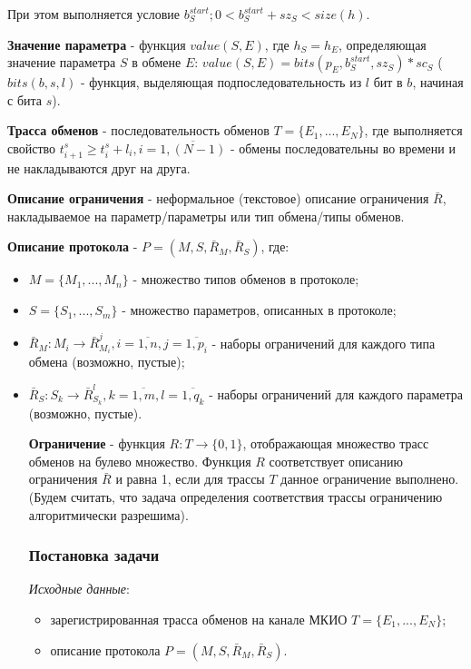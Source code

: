 При этом выполняется условие $b^{start}_S; 0 < b^{start}_S + sz_S < size(h)$.

\textbf{Значение параметра} - функция $value(S, E)$, где $h_S = h_E$, 
определяющая значение параметра $S$ в обмене $E$: $value(S, E) = bits(p_E, 
b^{start}_S, sz_S) * sc_S$ ($bits(b, s, l)$ - функция, выделяющая 
подпоследовательность из $l$ бит в $b$, начиная с бита $s$).

\textbf{Трасса обменов} - последовательность обменов $T = \{E_1, ..., E_N\}$, 
где выполняется свойство $t^s_{i+1} \geq t^s_{i} + l_{i}, i = 
\overline{1,(N-1)}$ - обмены последовательны во времени и не накладываются друг 
на друга.


\textbf{Описание ограничения} - неформальное (текстовое) описание ограничения 
$\bar{R}$, накладываемое на параметр/параметры или тип обмена/типы обменов.

\textbf{Описание протокола} - $P = (M, S, \bar{R}_M, \bar{R}_S)$, где:
 \begin{itemize}
  \item $M = \{M_1, ..., M_n\}$ - множество типов обменов в протоколе;
  \item $S = \{S_1, ..., S_m\}$ - множество параметров, описанных в протоколе;
  \item $\bar{R}_M: M_i \rightarrow \bar{R}_{M_i}^{j}, i = \overline{1,n}, j = 
\overline{1,p_i}$ - наборы ограничений для каждого типа
обмена (возможно, пустые);
  \item $\bar{R}_S: S_k \rightarrow \bar{R}_{S_k}^{l}, k = \overline{1,m}, l = 
\overline{1, 
q_k}$ - наборы ограничений для каждого параметра (возможно, пустые).

\textbf{Ограничение} - функция $R: T \rightarrow \{0, 1\}$, отображающая 
множество трасс обменов на булево множество. Функция $R$ соответствует описанию 
ограничения $\bar{R}$ и равна 1, если для трассы $T$ данное ограничение 
выполнено. (Будем считать, что задача определения соответствия трассы 
ограничению алгоритмически разрешима).
 
 
\subsubsection{Постановка задачи}

\textit{Исходные данные}: 

\begin{itemize}
 \item зарегистрированная трасса обменов на канале МКИО $T = \{E_1, ..., E_N\}$;
 \item описание протокола $P = (M, S, \bar{R}_M, \bar{R}_S)$.
 \end{itemize}
\end{itemize}

